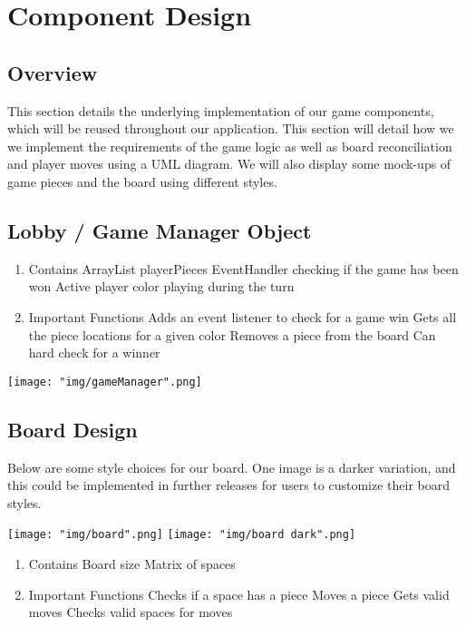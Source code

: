 \documentclass{scrreprt}
\begin{document}
\chapter{Component Design}
	\section{Overview}
	This section details the underlying implementation of our game components, which will be reused throughout our application. This section will detail how we we implement the requirements of the game logic as well as board reconciliation and player moves using a UML diagram. We will also display some mock-ups of game pieces and the board using different styles. 

	\section{Lobby / Game Manager Object}
		\begin{enumerate} [label*=\arabic*.]
		\item Contains
			\subitem ArrayList playerPieces
			\subitem EventHandler checking if the game has been won
			\subitem Active player color playing during the turn
		\item Important Functions
			\subitem Adds an event listener to check for a game win
			\subitem Gets all the piece locations for a given color
			\subitem Removes a piece from the board
			\subitem Can hard check for a winner
		\end{enumerate}

		\texttt{[image: "img/gameManager".png]}
	
	\section{Board Design}
	Below are some style choices for our board. One image is a darker variation, and this could be implemented in further releases for users to customize their board styles.

	\texttt{[image: "img/board".png]}
	\texttt{[image: "img/board dark".png]}

	\begin{enumerate} [label*=\arabic*.]
	\item Contains
		\subitem Board size
		\subitem Matrix of spaces
	\item Important Functions
		\subitem Checks if a space has a piece
		\subitem Moves a piece
		\subitem Gets valid moves
		\subitem Checks valid spaces for moves
	\end{enumerate}
\end{document}
